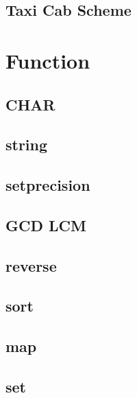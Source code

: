         \subsection{Taxi Cab Scheme}
                

\section{Function}
        \subsection{CHAR}
                
        \subsection{string}
                
        \subsection{setprecision}
                
        \subsection{GCD LCM}
                
        \subsection{reverse}
                
        \subsection{sort}
                
        \subsection{map}
                
        \subsection{set}
                